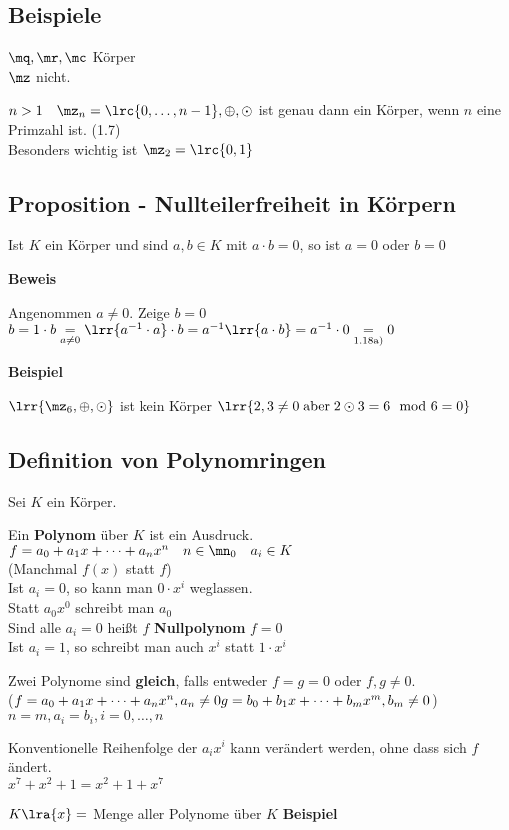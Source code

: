 \subsection{Beispiele}
		\item $\mq,\mr,\mc$ Körper\\
			$\mz$ nicht.
		\item $n>1\quad\mz_n=\lrc{0,\dots,n-1},\oplus,\odot$ ist genau dann ein Körper, wenn $n$ eine Primzahl ist. (1.7)\\
			Besonders wichtig ist $\mz_2=\lrc{0,1}$
	\subExEnd
\subsection{Proposition - Nullteilerfreiheit in Körpern}
	Ist $K$ ein Körper und sind $a,b\in K$ mit $a\cdot b=0$, so ist $a=0$ oder $b=0$
	
	\textbf{Beweis}
	
	Angenommen $a\neq 0$. Zeige $b=0$\\
	$b=1\cdot b \underset{a\neq 0}{=} \lrr{a^{-1}\cdot a}\cdot b=a^{-1}\lrr{a\cdot b}=a^{-1}\cdot 0\underset{\mbox{\scriptsize 1.18a)}}{=}0$
	
	\textbf{Beispiel}
	
	$\lrr{\mz_6,\oplus,\odot}$ ist kein Körper $\lrr{2,3\neq 0 \;\mbox{aber}\; 2\odot 3=6\mod 6 =0}$
\subsection{Definition von Polynomringen}
	Sei $K$ ein Körper.
		\item Ein \textbf{Polynom} über $K$ ist ein Ausdruck.\\
			$f=a_0+a_1x+\dots+a_nx^n\quad n\in\mn_0\quad a_i\in K$\\
			(Manchmal $f(x)$ statt $f$)\\
			Ist $a_i=0$, so kann man $0\cdot x^i$ weglassen.\\
			Statt $a_0x^0$ schreibt man $a_0$\\
			Sind alle $a_i=0$ heißt $f$ \textbf{Nullpolynom} $f=0$\\
			Ist $a_i = 1$, so schreibt man auch $x^i$ statt $1\cdot x^i$
		\item Zwei Polynome sind \textbf{gleich}, falls entweder $f=g=0$ oder $f,g\neq 0$.\\
      ($f=a_0+a_1x+\dots+a_nx^n,a_n\neq 0\\
      g=b_0+b_1x+\dots+b_mx^m,b_m\neq 0$)\\
			$n=m, a_i=b_i, i=0,\dots,n$
		\item Konventionelle Reihenfolge der $a_ix^i$ kann verändert werden, ohne dass sich $f$ ändert.\\
			$x^7+x^2+1=x^2+1+x^7$
		\item $K\lra{x}=$ Menge aller Polynome über $K$
	\subExEnd
	\textbf{Beispiel}
	
